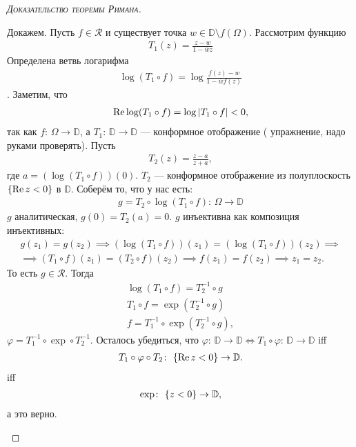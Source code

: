 \documentclass[../complex-analysis.tex]{subfiles}
\begin{document}
\begin{proof}[\normalfont\textsc{Доказательство теоремы Римана}]
\begin{enumerate}
   Докажем. Пусть $ f \in \mathcal R $ и существует точка $ w \in \mathbb D \setminus f(\Omega) $. Рассмотрим функцию
   \begin{align*}
    T_1(z) = \frac{z-w}{1 - \overline w z}
   \end{align*} Определена ветвь логарифма
   \begin{align*}
    \log (T_1 \circ f) = \log \frac{f(z) - w}{1 - \overline w f(z)}
   \end{align*}. Заметим, что
   \begin{align*}
    \operatorname{Re} \log (T_1 \circ f) = \log \left| T_1 \circ f \right| < 0,
   \end{align*} так как $ f \colon\,\Omega \to \mathbb D $, а $ T_1 \colon\,\mathbb D \to \mathbb D $ --- конформное отображение ({\color{red} упражнение, надо руками проверять}). Пусть
   \begin{align*}
    T_2(z) = \frac{z-a}{z+a},
   \end{align*} где $ a = (\log (T_1 \circ f))(0) $. $ T_2 $ --- конформное отображение из полуплоскость $ \left\{ \operatorname{Re} z < 0 \right\} $ в $ \mathbb D $. Соберём то, что у нас есть:
   \begin{align*}
    g = T_2 \circ \log (T_1 \circ f)\colon\,\Omega \to \mathbb D
   \end{align*} $ g $ аналитическая, $ g(0) = T_2(a) = 0 $. $ g $ инъективна как композиция инъективных:
   \begin{align*}
    g(z_1) = g(z_2) \implies (\log(T_1 \circ f))(z_1) = (\log(T_1 \circ f))(z_2) \implies \\ \implies (T_1 \circ f) (z_1) = (T_2 \circ f)(z_2) \implies f(z_1) = f(z_2) \implies z_1 = z_2.
   \end{align*} То есть $ g \in \mathcal R $. Тогда
   \begin{align*}
    \log(T_1 \circ f) = T_2^{-1} \circ g \\
    T_1 \circ f = \exp (T_2^{-1} \circ g) \\
    f = T_1^{-1} \circ \exp (T_2^{-1} \circ g),
   \end{align*} $ \varphi = T_1^{-1} \circ \exp \circ T_2^{-1} $. Осталось убедиться, что $ \varphi \colon\,\mathbb D \to \mathbb D \iff T_1 \circ \varphi \colon\,\mathbb D \to \mathbb D $ iff
   \begin{align*}
    T_1 \circ \varphi \circ T_2 \colon\,\left\{ \operatorname{Re} z < 0 \right\} \to \mathbb D.
   \end{align*} iff
   \begin{align*}
    \exp \colon\,\left\{ \real z < 0 \right\} \to \mathbb D,
   \end{align*} а это верно.


\end{enumerate}
\end{proof}
\end{document}
